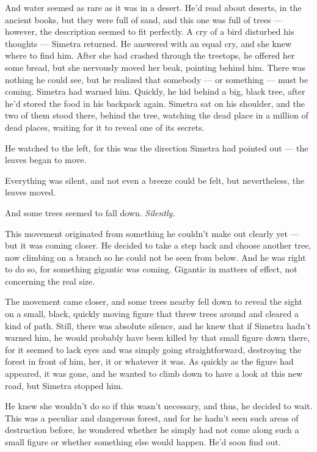 And water seemed as rare as it was in a desert. He'd read about deserts, in the ancient books, but they were full of sand, and this one was full of trees --- however, the description seemed to fit perfectly. 
A cry of a bird disturbed his thoughts --- Simetra returned. He answered with an equal cry, and she knew where to find him. After she had crashed through the treetops, he offered her some bread, but she nervously moved her beak, pointing behind him. There was nothing he could see, but he realized that somebody --- or something --- must be coming. Simetra had warned him. 
Quickly, he hid behind a big, black tree, after he'd stored the food in his backpack again. Simetra sat on his shoulder, and the two of them stood there, behind the tree, watching the dead place in a million of dead places, waiting for it to reveal one of its secrets.

He watched to the left, for this was the direction Simetra had pointed out --- the leaves began to move.

Everything was silent, and not even a breeze could be felt, but nevertheless, the leaves moved.

And some trees seemed to fall down. \emph{Silently.}

This movement originated from something he couldn't make out clearly yet --- but it was coming closer. He decided to take a step back and choose another tree, now climbing on a branch so he could not be seen from below.  And he was right to do so, for something gigantic was coming. Gigantic in matters of effect, not concerning the real size.

The movement came closer, and some trees nearby fell down to reveal the sight on a small, black, quickly moving figure that threw trees around and cleared a kind of path. Still, there was absolute silence, and he knew that if Simetra hadn't warned him, he would probably have been killed by that small figure down there, for it seemed to lack eyes and was simply going straightforward, destroying the forest in front of him, her, it or whatever it was. As quickly as the figure had appeared, it was gone, and he wanted to climb down to have a look at this new road, but Simetra stopped him.

He knew she wouldn't do so if this wasn't necessary, and thus, he decided to wait. This was a peculiar and dangerous forest, and for he hadn't seen such areas of destruction before, he wondered whether he simply had not come along such a small figure or whether something else would happen. 
He'd soon find out.

